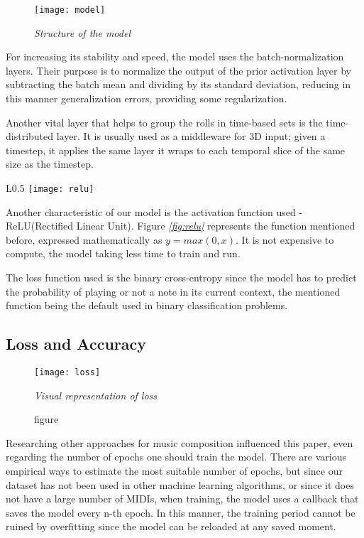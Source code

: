 \begin{figure}[H]
      \centering
      \texttt{[image: model]}
      \caption{\emph{Structure of the model}}
      \label{fig:model}
\end{figure}

For increasing its stability and speed, the model uses the batch-normalization layers.
Their purpose is to normalize the output of the prior activation layer
by subtracting the batch mean and dividing by its standard deviation,
reducing in this manner generalization errors, providing some regularization. \cite{batchNorm}


Another vital layer that helps to group the rolls in time-based sets is the time-distributed layer.
It is usually used as a middleware for 3D input; given a timestep,
it applies the same layer it wraps to each temporal slice of the same size as the timestep.\cite{keras}

\begin{wrapfigure}[8]{L}{0.5\textwidth}
      \centering
      \texttt{[image: relu]}
      \caption{\emph{ReLU visual representation \cite{relu}}}
      \label{fig:relu}
\end{wrapfigure}

Another characteristic of our model is the activation function used -
ReLU(Rectified Linear Unit). Figure \emph{\ref{fig:relu}} represents the function mentioned before,
expressed mathematically as $y = max(0, x)$. It is not expensive to compute,
the model taking less time to train and run. \cite{relu}

The loss function used is the binary cross-entropy since the model
has to predict the probability of playing or not a note in its current context,
the mentioned function being the default used in binary classification problems.\cite{cross}


\subsection{Loss and Accuracy}


\begin{figure}[h]
      \centering
      \texttt{[image: loss]}
      \caption{figure}{\emph{Visual representation of loss}}
      \label{fig:loss}
\end{figure}

Researching other approaches for music composition influenced this paper,
even regarding the number of epochs one should train the model.
There are various empirical ways to estimate the most suitable number of epochs,
but since our dataset has not been used in other machine learning algorithms,
or since it does not have a large number of MIDIs, when training,
the model uses a callback that saves the model every n-th epoch.
In this manner, the training period cannot be ruined by overfitting
since the model can be reloaded at any saved moment.


